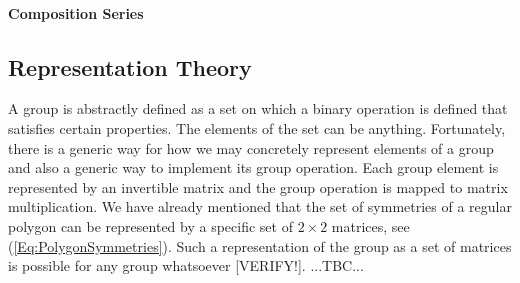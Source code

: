 


\paragraph{Composition Series}








\subsection{Representation Theory}
A group is abstractly defined as a set on which a binary operation is defined that satisfies certain properties. The elements of the set can be anything. Fortunately, there is a generic way for how we may concretely represent elements of a group and also a generic way to implement its group operation. Each group element is represented by an invertible matrix and the group operation is mapped to matrix multiplication. We have already mentioned that the set of symmetries of a regular polygon can be represented by a specific set of $2 \times 2$ matrices, see (\ref{Eq:PolygonSymmetries}). Such a representation of the group as a set of matrices is possible for any group whatsoever [VERIFY!]. ...TBC...


